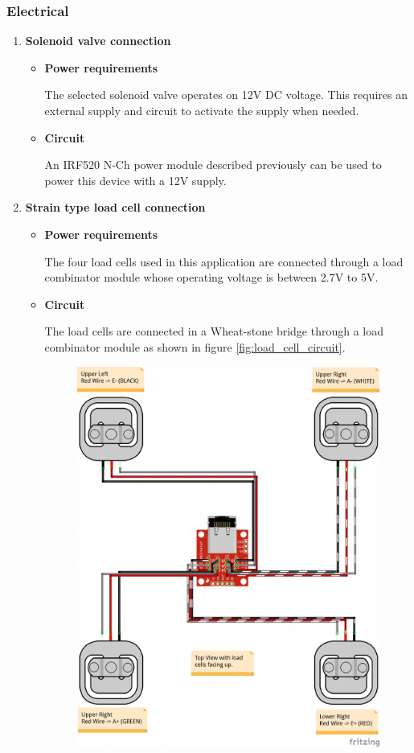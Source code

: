\subsubsection{Electrical}
\begin{enumerate}
    \item \textbf{Solenoid valve connection}
    \par
    \begin{itemize}
        \item \textbf{Power requirements}
        \par
        The selected solenoid valve operates on 12V DC voltage. This requires an external supply and circuit to activate the supply when needed.
        \item \textbf{Circuit}
        \par
        An IRF520 N-Ch power module described previously can be used to power this device with a 12V supply.
    \end{itemize}
    \item \textbf{Strain type load cell connection}
    \par
    \begin{itemize}
        \item \textbf{Power requirements}
        \par
        The four load cells used in this application are connected through a load combinator module whose operating voltage is between 2.7V to 5V.
        \item \textbf{Circuit}
        \par
        The load cells are connected in a Wheat-stone bridge through a load combinator module as shown in figure \ref{fig:load_cell_circuit}.
        \begin{figure}[H]
            \centering
            \includegraphics[width=.45\textwidth, height=.65\textheight]{Figures/load_cell_combined.jpg}

\end{figure}
\end{itemize}
\end{enumerate}
